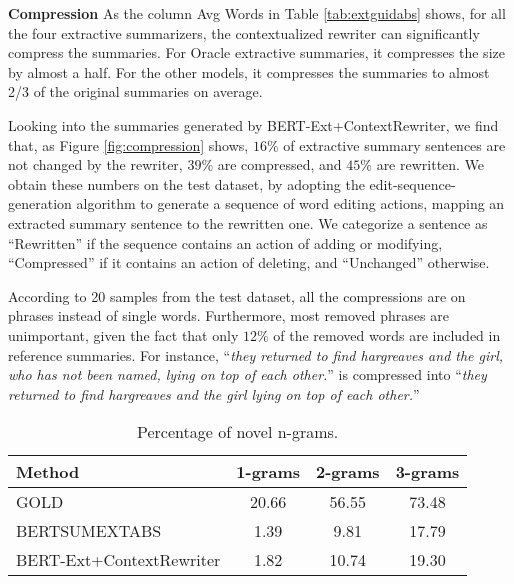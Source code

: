 \documentclass[letterpaper]{article} %
\begin{document}
\textbf{Compression} As the column Avg Words in Table \ref{tab:extguidabs} shows, for all the four extractive summarizers, the contextualized rewriter can significantly compress the summaries. For Oracle extractive summaries, it compresses the size by almost a half. For the other models, it compresses the summaries to almost 2/3 of the original summaries on average. 

Looking into the summaries generated by BERT-Ext+ContextRewriter, we find that, as Figure \ref{fig:compression} shows,  $16\%$ of extractive summary sentences are not changed by the rewriter, $39\%$ are compressed, and $45\%$ are rewritten. We obtain these numbers on the test dataset, by adopting the edit-sequence-generation algorithm \cite{Zhang2014} to generate a sequence of word editing actions, mapping an extracted summary sentence to the rewritten one. We categorize a sentence as ``Rewritten'' if the sequence contains an action of adding or modifying, ``Compressed'' if it contains an action of deleting,  and ``Unchanged'' otherwise.

According to 20 samples from the test dataset, all the compressions are on phrases instead of single words. Furthermore, most removed phrases are unimportant, given the fact that only $12\%$ of the removed words are included in reference summaries. For instance, ``{\it they returned to find hargreaves and the girl, who has not been named, lying on top of each other.}'' is compressed into ``{\it they returned to find hargreaves and the girl lying on top of each other.}''


\begin{table}[t]
    \centering\small
    \begin{tabular}{@{}lccc@{}}
        \hline
        \bf{Method} & \bf{1-grams} & \bf{2-grams} & \bf{3-grams} \\
        \hline
        GOLD & 20.66 & 56.55 & 73.48  \\
        BERTSUMEXTABS & 1.39 & 9.81 & 17.79  \\
        BERT-Ext+ContextRewriter & 1.82 & 10.74 & 19.30  \\
        \hline
    \end{tabular}
    \caption{Percentage of novel n-grams.}
    \label{tab:novelngrams}
\end{table}
\end{document}

